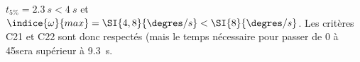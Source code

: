 \ifprof
\begin{corrige}

$t_{5\%}=\SI{2,3}{s}<\SI{4}{s}$ et $\indice{\omega}{max} = \SI{4,8}{\degres/s}<\SI{8}{\degres/s}$. 
Les critères C21 et C22 sont donc respectés (mais le temps nécessaire pour passer de 0 à 45\degres sera supérieur à \SI{9,3}{s}. 


\end{corrige}
\else
\fi

